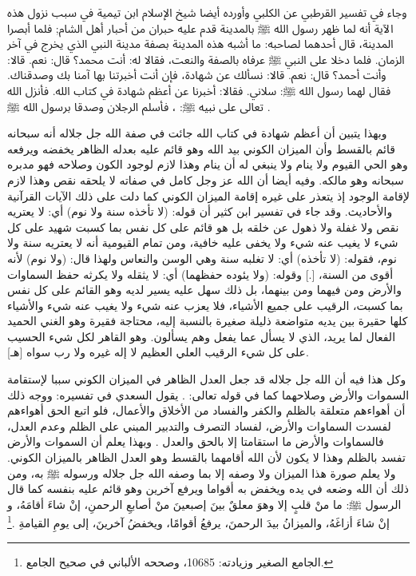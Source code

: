 وجاء في تفسير القرطبي عن الكلبي وأورده أيضا شيخ الإسلام ابن تيمية في سبب نزول هذه الآية أنه لما ظهر رسول الله ﷺ بالمدينة قدم عليه حبران من أحبار أهل الشام; فلما أبصرا المدينة، قال أحدهما لصاحبه: ما أشبه هذه المدينة بصفة مدينة النبي الذي يخرج في آخر الزمان. فلما دخلا على النبي ﷺ عرفاه بالصفة والنعت، فقالا له: أنت محمد؟ قال: نعم. قالا: وأنت أحمد؟ قال: نعم. قالا: نسألك عن شهادة، فإن أنت أخبرتنا بها آمنا بك وصدقناك. فقال لهما رسول الله ﷺ: سلاني. فقالا: أخبرنا عن أعظم شهادة في كتاب الله. فأنزل الله تعالى على نبيه ﷺ: \quranayah*[3][18]{\footnotesize \surahname*[3]}، فأسلم الرجلان وصدقا برسول الله ﷺ \href{https://shamela.ws/book/20855/1383#p4}{\faExternalLink} \cite{tafsir_Qurtubi}.

وبهذا يتبين أن أعظم شهادة في كتاب الله جائت في صفة الله جل جلاله أنه سبحانه قائم بالقسط وأن الميزان الكوني بيد الله وهو قائم عليه بعدله الظاهر يخفضه ويرفعه وهو الحي القيوم ولا ينام ولا ينبغي له أن ينام وهذا لازم لوجود الكون وصلاحه فهو مدبره سبحانه وهو مالكه. وفيه أيضا أن الله عز وجل كامل في صفاته لا يلحقه نقص وهذا لازم لإقامة الوجود إذ يتعذر على غيره إقامة الميزان الكوني كما دلت على ذلك الآيات القرآنية والأحاديث. وقد جاء في تفسير ابن كثير أن قوله: (لا تأخذه سنة ولا نوم) أي: لا يعتريه نقص ولا غفلة ولا ذهول عن خلقه بل هو قائم على كل نفس بما كسبت شهيد على كل شيء لا يغيب عنه شيء ولا يخفى عليه خافية، ومن تمام القيومية أنه لا يعتريه سنة ولا نوم، فقوله: (لا تأخذه) أي: لا تغلبه سنة وهي الوسن والنعاس ولهذا قال: (ولا نوم) لأنه أقوى من السنة، [.] وقوله: (ولا يئوده حفظهما) أي: لا يثقله ولا يكرثه حفظ السماوات والأرض ومن فيهما ومن بينهما، بل ذلك سهل عليه يسير لديه وهو القائم على كل نفس بما كسبت، الرقيب على جميع الأشياء، فلا يعزب عنه شيء ولا يغيب عنه شيء والأشياء كلها حقيرة بين يديه متواضعة ذليلة صغيرة بالنسبة إليه، محتاجة فقيرة وهو الغني الحميد الفعال لما يريد، الذي لا يسأل عما يفعل وهم يسألون. وهو القاهر لكل شيء الحسيب على كل شيء الرقيب العلي العظيم لا إله غيره ولا رب سواه [هـ].

وكل هذا فيه أن الله جل جلاله قد جعل العدل الظاهر في الميزان الكوني سببا لإستقامة السموات والأرض وصلاحهما كما في قوله تعالى:
\quranayah*[23][71]{\footnotesize \surahname*[23]}. يقول السعدي في تفسيره:
ووجه ذلك أن أهواءهم متعلقة بالظلم والكفر والفساد من الأخلاق والأعمال، فلو اتبع الحق أهواءهم لفسدت السماوات والأرض، لفساد التصرف والتدبير المبني على الظلم وعدم العدل، فالسماوات والأرض ما استقامتا إلا بالحق والعدل \href{https://shamela.ws/book/42/1255#p12}{\faExternalLink} \cite{tafsir_Saadi}. وبهذا يعلم أن السموات والأرض تفسد بالظلم وهذا لا يكون لأن الله أقامهما بالقسط وهو العدل الظاهر بالميزان الكوني. ولا يعلم صورة هذا الميزان ولا وصفه إلا بما وصفه الله جل جلاله ورسوله ﷺ به، ومن ذلك أن الله وضعه في يده ويخفض به أقواما ويرفع آخرين وهو قائم عليه بنفسه كما قال الرسول ﷺ: ما منْ قلبٍ إلا وهوَ معلقٌ بينَ إصبعينَ منْ أصابعِ الرحمنِ، إنْ شاءَ أقامَهُ، و إنْ شاءَ أزاغَهُ، والميزانُ بيدَ الرحمنَ، يرفعُ أقوامًا، ويخفضُ آخرينَ، إلى يومِ القيامةِ \href{https://shamela.ws/book/21659/10685#p1}{\faExternalLink} \cite{jamaaSagheer}.\footnote{الجامع الصغير وزيادته: 10685، وصححه الألباني في صحيح الجامع.}

